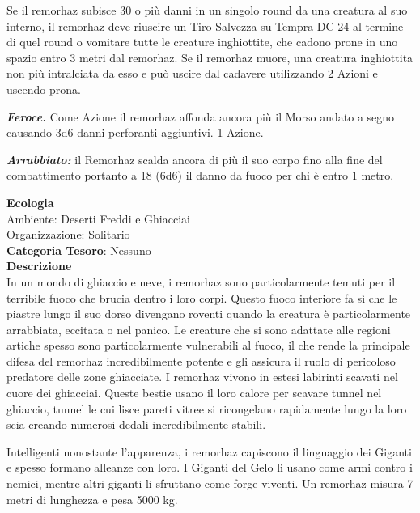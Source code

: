 \begin{multicols}{2}
{Se il remorhaz subisce 30 o più danni in un singolo round da una creatura al suo interno, il remorhaz deve riuscire un Tiro Salvezza su Tempra DC 24 al termine di quel round o vomitare tutte le creature inghiottite, che cadono prone in uno spazio entro 3 metri dal remorhaz. Se il remorhaz muore, una creatura inghiottita non più intralciata da esso e può uscire dal cadavere utilizzando 2 Azioni e uscendo prona.

\emph{\textbf{Feroce.}} Come Azione il remorhaz affonda ancora più il Morso andato a segno causando 3d6 danni perforanti aggiuntivi. 1 Azione.

\emph{\textbf{Arrabbiato:}} il Remorhaz scalda ancora di più il suo corpo fino alla fine del combattimento portanto a 18 (6d6) il danno da fuoco per chi è entro 1 metro.

\textbf{Ecologia}\\
Ambiente: Deserti Freddi e Ghiacciai\\
Organizzazione: Solitario\\
\textbf{Categoria Tesoro}: Nessuno\\
\textbf{Descrizione}\\
In un mondo di ghiaccio e neve, i remorhaz sono particolarmente temuti per il terribile fuoco che brucia dentro i loro corpi. Questo fuoco interiore fa sì che le piastre lungo il suo dorso divengano roventi quando la creatura è particolarmente arrabbiata, eccitata o nel panico. Le creature che si sono adattate alle regioni artiche spesso sono particolarmente vulnerabili al fuoco, il che rende la principale difesa del remorhaz incredibilmente potente e gli assicura il ruolo di pericoloso predatore delle zone ghiacciate. I remorhaz vivono in estesi labirinti scavati nel cuore dei ghiacciai. Queste bestie usano il loro calore per scavare tunnel nel ghiaccio, tunnel le cui lisce pareti vitree si ricongelano rapidamente lungo la loro scia creando numerosi dedali incredibilmente stabili.

Intelligenti nonostante l'apparenza, i remorhaz capiscono il linguaggio dei Giganti e spesso formano alleanze con loro. I Giganti del Gelo li usano come armi contro i nemici, mentre altri giganti li sfruttano come forge viventi. Un remorhaz misura 7 metri di lunghezza e pesa 5000 kg.

}
\end{multicols}
